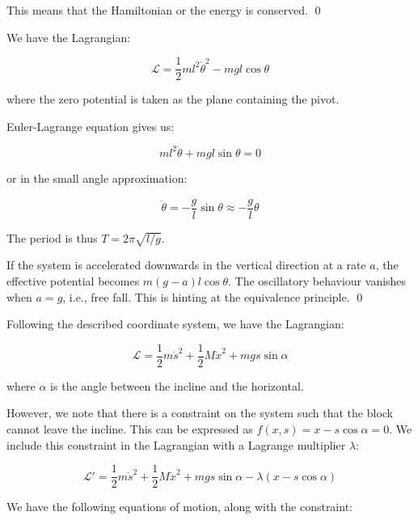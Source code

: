 \documentclass[12pt]{article}
\begin{document}
This means that the Hamiltonian or the energy is conserved.
\qed


We have the Lagrangian:

\begin{equation}
    \mathcal{L} = \frac{1}{2} m l^{2} \dot{\theta}^{2} - mgl \cos{\theta}
\end{equation}

where the zero potential is taken as the plane containing the pivot.

Euler-Lagrange equation gives us:

\begin{equation}
    ml^{2} \ddot{\theta} + mgl \sin{\theta} = 0
\end{equation}

or in the small angle approximation:

\begin{equation}
    \ddot{\theta} = -\frac{g}{l} \sin{\theta} \approx -\frac{g}{l} \theta
\end{equation}

The period is thus $T = 2\pi \sqrt{l/g}$.

If the system is accelerated downwards in the vertical direction at a rate $a$, the effective potential becomes $m(g - a)l \cos{\theta}$. The oscillatory behaviour vanishes when $a = g$, i.e., free fall. This is hinting at the equivalence principle.
\qed


Following the described coordinate system, we have the Lagrangian:

\begin{equation}
    \mathcal{L} = \frac{1}{2} m \dot{s}^{2} + \frac{1}{2} M \dot{x}^{2} + mgs \sin{\alpha}
\end{equation}

where $\alpha$ is the angle between the incline and the horizontal.

However, we note that there is a constraint on the system such that the block cannot leave the incline. This can be expressed as $f(x, s) = x - s \cos{\alpha} = 0$. We include this constraint in the Lagrangian with a Lagrange multiplier $\lambda$:

\begin{equation}
    \mathcal{L}' = \frac{1}{2} m \dot{s}^{2} + \frac{1}{2} M \dot{x}^{2} + mgs \sin{\alpha} - \lambda \left( x - s\cos{\alpha} \right)
\end{equation}

We have the following equations of motion, along with the constraint:
\end{document}
